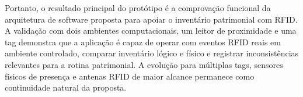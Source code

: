 Portanto, o resultado principal do protótipo é a comprovação funcional da arquitetura de software proposta para apoiar o inventário patrimonial com RFID. A validação com dois ambientes computacionais, um leitor de proximidade e uma tag demonstra que a aplicação é capaz de operar com eventos RFID reais em ambiente controlado, comparar inventário lógico e físico e registrar inconsistências relevantes para a rotina patrimonial. A evolução para múltiplas tags, sensores físicos de presença e antenas RFID de maior alcance permanece como continuidade natural da proposta.
